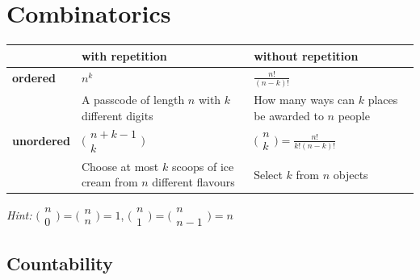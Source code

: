\documentclass[11pt]{article}
\begin{document}
\section{Combinatorics}

\begin{table}[H]
\centering
\begin{tabular}{|p{2cm}|p{6cm}|p{6cm}|}
\hline
                   & \textbf{with repetition} & \textbf{without repetition} \\\hline
\textbf{ordered}   & $n^k$                         							 	  & $\frac{n!}{(n-k)!}$    \\\cline{2-3}
				   & A passcode of length $n$ with $k$ different digits           & How many ways can $k$ places be awarded to $n$ people                       \\\hline
\textbf{unordered} & $\bigl(\begin{smallmatrix}n+k-1\\k \end{smallmatrix} \bigr)$ & $\bigl(\begin{smallmatrix}n\\k \end{smallmatrix} \bigr) = \frac{n!}{k!(n-k)!}$ \\\cline{2-3}
				   & Choose at most $k$ scoops of ice cream from $n$ different flavours   & Select $k$ from $n$ objects                             \\\hline
\end{tabular}
\end{table}

\emph{Hint:} $\bigl(\begin{smallmatrix}n\\0 \end{smallmatrix} \bigr) = \bigl(\begin{smallmatrix}n\\n \end{smallmatrix} \bigr) = 1$, $\bigl(\begin{smallmatrix}n\\1 \end{smallmatrix} \bigr) = \bigl(\begin{smallmatrix}n\\n-1 \end{smallmatrix} \bigr) = n$

\subsection{Countability}
\end{document}
